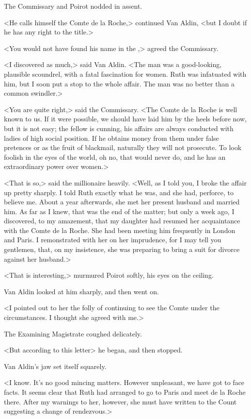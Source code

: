 The Commissary and Poirot nodded in assent.

<He calls himself the Comte de la Roche,> continued Van Aldin, <but I doubt if he has any right to the title.>

<You would not have found his name in the ,> agreed the Commissary.

<I discovered as much,> said Van Aldin. <The man was a good-looking, plausible scoundrel, with a fatal fascination for women. Ruth was infatuated with him, but I soon put a stop to the whole affair. The man was no better than a common swindler.>

<You are quite right,> said the Commissary. <The Comte de la Roche is well known to us. If it were possible, we should have laid him by the heels before now, but  it is not easy; the fellow is cunning, his affairs are always conducted with ladies of high social position. If he obtains money from them under false pretences or as the fruit of blackmail,  naturally they will not prosecute. To look foolish in the eyes of the world, oh no, that would never do, and he has an extraordinary power over women.>

<That is so,> said the millionaire heavily. <Well, as I told you, I broke the affair up pretty sharply. I told Ruth exactly what he was, and she had, perforce, to believe me. About a year afterwards, she met her present husband and married him. As far as I knew, that was the end of the matter; but only a week ago, I discovered, to my amazement, that my daughter had resumed her acquaintance with the Comte de la Roche. She had been meeting him frequently in London and Paris. I remonstrated with her on her imprudence, for I may tell you gentlemen, that, on my insistence, she was preparing to bring a suit for divorce against her husband.>

<That is interesting,> murmured Poirot softly, his eyes on the ceiling.

Van Aldin looked at him sharply, and then went on.

<I pointed out to her the folly of continuing to see the Comte under the circumstances. I thought she agreed with me.>

The Examining Magistrate coughed delicately.

<But according to this letter\longdash> he began, and then stopped.

Van Aldin's jaw set itself squarely.

<I know. It's no good mincing matters. However unpleasant, we have got to face facts. It seems clear that Ruth had arranged to go to Paris and meet de la Roche there. After my warnings to her, however, she must have written to the Count suggesting a change of rendezvous.>

